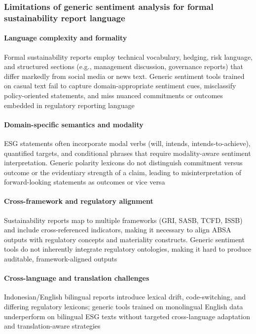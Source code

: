 \subsubsection{Limitations of generic sentiment analysis for formal sustainability report language}

\paragraph{Language complexity and formality}
Formal sustainability reports employ technical vocabulary, hedging, risk language, and structured sections (e.g., management discussion, governance reports) that differ markedly from social media or news text. Generic sentiment tools trained on casual text fail to capture domain-appropriate sentiment cues, misclassify policy-oriented statements, and miss nuanced commitments or outcomes embedded in regulatory reporting language \cite{10.1098/rsos.241687,10.1108/mrr-07-2023-0526,10.1177/21582440251383232}

\paragraph{Domain-specific semantics and modality}
ESG statements often incorporate modal verbs (will, intends, intends-to-achieve), quantified targets, and conditional phrases that require modality-aware sentiment interpretation. Generic polarity lexicons do not distinguish commitment versus outcome or the evidentiary strength of a claim, leading to misinterpretation of forward-looking statements as outcomes or vice versa \cite{10.1016/j.irfa.2022.102307,10.1108/ijaim-08-2023-0206,10.1111/eufm.12509}
\paragraph{Cross-framework and regulatory alignment}
Sustainability reports map to multiple frameworks (GRI, SASB, TCFD, ISSB) and include cross-referenced indicators, making it necessary to align ABSA outputs with regulatory concepts and materiality constructs. Generic sentiment tools do not inherently integrate regulatory ontologies, making it hard to produce auditable, framework-aligned outputs \cite{10.1108/medar-11-2021-1486,10.1007/978-3-319-04723-2_7,10.1111/ablj.12148,10.1108/ijlma-06-2022-0113}
\paragraph{Cross-language and translation challenges}
Indonesian/English bilingual reports introduce lexical drift, code-switching, and differing regulatory lexicons; generic tools trained on monolingual English data underperform on bilingual ESG texts without targeted cross-language adaptation and translation-aware strategies \cite{10.1016/j.inffus.2025.103073,10.1111/eufm.12509,10.48550/arxiv.2511.00024}
